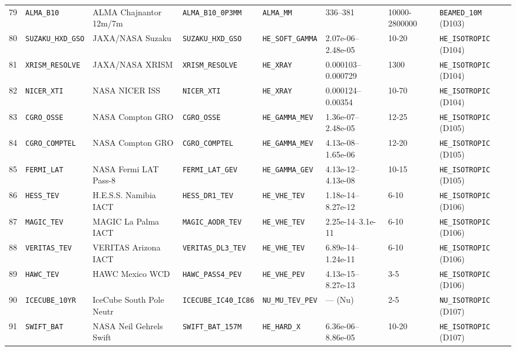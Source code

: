 \documentclass[twocolumn,10pt]{article}
\begin{document}
\begin{table}[!ht]
{\begin{tabular}{rlllllll}
79 & \texttt{ALMA\_B10} & ALMA Chajnantor 12m/7m & \texttt{ALMA\_B10\_0P3MM} & \texttt{ALMA\_MM} & 336--381 & 10000-2800000 & \texttt{BEAMED\_10M} (D103) \\
80 & \texttt{SUZAKU\_HXD\_GSO} & JAXA/NASA Suzaku & \texttt{SUZAKU\_HXD\_GSO} & \texttt{HE\_SOFT\_GAMMA} & 2.07e-06--2.48e-05 & 10-20 & \texttt{HE\_ISOTROPIC} (D104) \\
81 & \texttt{XRISM\_RESOLVE} & JAXA/NASA XRISM & \texttt{XRISM\_RESOLVE} & \texttt{HE\_XRAY} & 0.000103--0.000729 & 1300 & \texttt{HE\_ISOTROPIC} (D104) \\
82 & \texttt{NICER\_XTI} & NASA NICER ISS & \texttt{NICER\_XTI} & \texttt{HE\_XRAY} & 0.000124--0.00354 & 10-70 & \texttt{HE\_ISOTROPIC} (D104) \\
83 & \texttt{CGRO\_OSSE} & NASA Compton GRO & \texttt{CGRO\_OSSE} & \texttt{HE\_GAMMA\_MEV} & 1.36e-07--2.48e-05 & 12-25 & \texttt{HE\_ISOTROPIC} (D105) \\
84 & \texttt{CGRO\_COMPTEL} & NASA Compton GRO & \texttt{CGRO\_COMPTEL} & \texttt{HE\_GAMMA\_MEV} & 4.13e-08--1.65e-06 & 12-20 & \texttt{HE\_ISOTROPIC} (D105) \\
85 & \texttt{FERMI\_LAT} & NASA Fermi LAT Pass-8 & \texttt{FERMI\_LAT\_GEV} & \texttt{HE\_GAMMA\_GEV} & 4.13e-12--4.13e-08 & 10-15 & \texttt{HE\_ISOTROPIC} (D105) \\
86 & \texttt{HESS\_TEV} & H.E.S.S. Namibia IACT & \texttt{HESS\_DR1\_TEV} & \texttt{HE\_VHE\_TEV} & 1.18e-14--8.27e-12 & 6-10 & \texttt{HE\_ISOTROPIC} (D106) \\
87 & \texttt{MAGIC\_TEV} & MAGIC La Palma IACT & \texttt{MAGIC\_AODR\_TEV} & \texttt{HE\_VHE\_TEV} & 2.25e-14--3.1e-11 & 6-10 & \texttt{HE\_ISOTROPIC} (D106) \\
88 & \texttt{VERITAS\_TEV} & VERITAS Arizona IACT & \texttt{VERITAS\_DL3\_TEV} & \texttt{HE\_VHE\_TEV} & 6.89e-14--1.24e-11 & 6-10 & \texttt{HE\_ISOTROPIC} (D106) \\
89 & \texttt{HAWC\_TEV} & HAWC Mexico WCD & \texttt{HAWC\_PASS4\_PEV} & \texttt{HE\_VHE\_PEV} & 4.13e-15--8.27e-13 & 3-5 & \texttt{HE\_ISOTROPIC} (D106) \\
90 & \texttt{ICECUBE\_10YR} & IceCube South Pole Neutr & \texttt{ICECUBE\_IC40\_IC86} & \texttt{NU\_MU\_TEV\_PEV} & --- (Nu) & 2-5 & \texttt{NU\_ISOTROPIC} (D107) \\
91 & \texttt{SWIFT\_BAT} & NASA Neil Gehrels Swift & \texttt{SWIFT\_BAT\_157M} & \texttt{HE\_HARD\_X} & 6.36e-06--8.86e-05 & 10-20 & \texttt{HE\_ISOTROPIC} (D107) \\

\end{tabular}}
\end{table}
\end{document}
